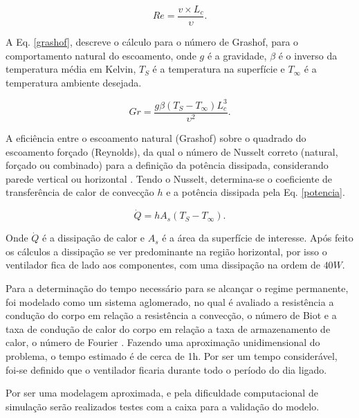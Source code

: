 \begin{equation}
	Re= \frac{v \times L_c}{\upsilon}.
	\label{reynolds}
\end{equation}

A Eq. \ref{grashof}, descreve o cálculo para o número de Grashof, para o comportamento natural do escoamento, onde $g$ é a gravidade, $\beta$ é o inverso da temperatura média em Kelvin, $T_S$ é a temperatura na superfície e $T_{\infty}$ é a temperatura ambiente desejada.

\begin{equation}
	Gr= \frac{g \beta (T_S-T_{\infty})L_c^3}{\upsilon^2}.
	\label{grashof}
\end{equation}

A eficiência entre o escoamento natural (Grashof) sobre o quadrado do escoamento forçado (Reynolds), da qual o número de Nusselt correto (natural, forçado ou combinado) para a definição da potência dissipada, considerando parede vertical ou horizontal \cite{livro_transcal}. Tendo o Nusselt, determina-se o coeficiente de transferência de calor de convecção $h$ e a potência dissipada pela Eq. \ref{potencia}.

\begin{equation}
	\dot{Q}= hA_s(T_S-T_{\infty}).
	\label{potencia}
\end{equation}

Onde $\dot{Q}$ é a dissipação de calor e $A_s$ é a área da superfície de interesse. Após feito os cálculos a dissipação se ver predominante na região horizontal, por isso o ventilador fica de lado aos componentes, com uma dissipação na ordem de $40W$.

Para a determinação do tempo necessário para se alcançar o regime permanente, foi modelado como um sistema aglomerado, no qual é avaliado a resistência a condução do corpo em relação a resistência a convecção, o número de Biot e a taxa de condução de calor do corpo em relação a taxa de armazenamento de calor, o número de Fourier \cite{livro_transcal}. Fazendo uma aproximação unidimensional do problema, o tempo estimado é de cerca de 1h. Por ser um tempo considerável, foi-se definido que o ventilador ficaria durante todo o período do dia ligado.


Por ser uma modelagem aproximada, e pela dificuldade computacional de simulação serão realizados testes com a caixa para a validação do modelo. 


